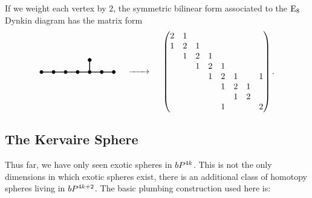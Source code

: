 \begin{example}
	If we weight each vertex by $2$, the symmetric bilinear form associated to the $\mathrm{E}_8$ Dynkin diagram has the matrix form
	\[
		\begin{tikzpicture}
			\tikzset{dynode/.style={circle, draw, fill=black,
						minimum size=4pt, inner sep=0pt}}
			\tikzset{dyline/.style={line width=1pt}}
			\tikzset{dydash/.style={line width=1pt, dashed}}

			\begin{scope}[yshift=-10em, xshift=0]
				\node[dynode] (a1) at (0,0) {};
				\node[dynode] (a2) at (0.5,0) {};
				\node[dynode] (a3) at (1,0) {};
				\node[dynode] (a4) at (1.5,0) {};
				\node[dynode] (a5) at (2,0) {};
				\node[dynode] (a6) at (2.5,0) {};
				\node[dynode] (a7) at (3,0) {};
				\node[dynode] (a8) at (2,0.5) {};

				\draw[dyline] (a1) -- (a2) -- (a3) -- (a4) -- (a5) -- (a6) -- (a7);
				\draw[dyline] (a5) -- (a8);
			\end{scope}
		\end{tikzpicture}
		\quad\lkxto\quad
		\begin{pmatrix}
			2 & 1 &   &   &   &   &   &   \\
			1 & 2 & 1 &   &   &   &   &   \\
			  & 1 & 2 & 1 &   &   &   &   \\
			  &   & 1 & 2 & 1 &   &   &   \\
			  &   &   & 1 & 2 & 1 &   & 1 \\
			  &   &   &   & 1 & 2 & 1 &   \\
			  &   &   &   &   & 1 & 2 &   \\
			  &   &   &   & 1 &   &   & 2 \\
		\end{pmatrix}.
	\]
\end{example}

\subsection{The Kervaire Sphere}\label{sec:kervaire-invariant}

Thus far, we have only seen exotic spheres in $bP^{4k}$. This is not the only dimensions in which exotic spheres exist, there is an additional class of homotopy spheres living in $bP^{4k+2}$. The basic plumbing construction used here is:

